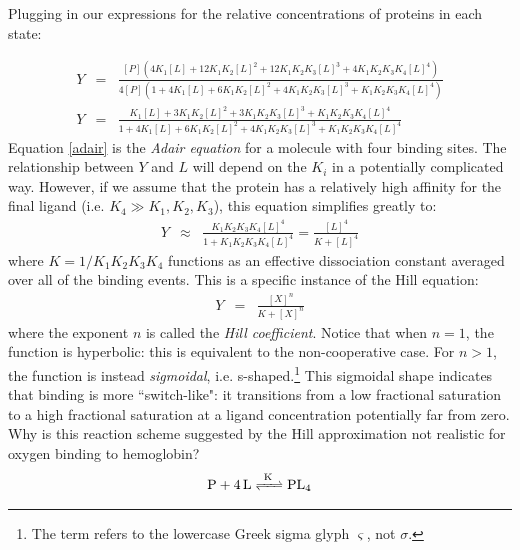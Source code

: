 \documentclass{article}
\begin{document}
Plugging in our expressions for the relative concentrations of proteins in each state:

\begin{eqnarray}
Y & = & \frac{\left[ P \right] \left( 4 K_1 \left[ L \right] + 12K_1K_2 \left[ L \right]^2 + 12K_1K_2K_3 \left[ L \right]^3 + 4K_1K_2K_3K_4 \left[ L \right]^4 \right)}{4\left[ P \right] \left( 1 + 4K_1 \left[ L \right] + 6K_1K_2 \left[ L \right]^2 + 4K_1K_2K_3 \left[ L \right]^3 + K_1K_2K_3K_4 \left[ L \right]^4\right)} \nonumber\\
Y & = & \frac{K_1 \left[ L \right] + 3K_1K_2 \left[ L \right]^2 + 3K_1K_2K_3 \left[ L \right]^3 + K_1K_2K_3K_4 \left[ L \right]^4}{1 + 4K_1 \left[ L \right] + 6K_1K_2 \left[ L \right]^2 + 4K_1K_2K_3 \left[ L \right]^3 + K_1K_2K_3K_4 \left[ L \right]^4 \label{adair}}
\end{eqnarray}
Equation \ref{adair} is the \textit{Adair equation} for a molecule with four binding sites. The relationship between $Y$ and $L$ will depend on the $K_i$ in a potentially complicated way. However, if we assume that the protein has a relatively high affinity for the final ligand (i.e. $K_4 \gg K_1, K_2, K_3$), this equation simplifies greatly to:
\begin{eqnarray*}
Y & \approx & \frac{K_1K_2K_3K_4 \left[ L \right]^4}{1 + K_1K_2K_3K_4 \left[ L \right]^4} = \frac{\left[ L \right]^4}{K + \left[ L \right]^4}
\end{eqnarray*}
where $K = 1/K_1K_2K_3K_4$ functions as an effective dissociation constant averaged over all of the binding events. This is a specific instance of the Hill equation:
\begin{eqnarray}
Y & = & \frac{\left[ X \right]^n}{K + \left[ X \right]^n\label{hill}}
\end{eqnarray}
where the exponent $n$ is called the \textit{Hill coefficient}. Notice that when $n=1$, the function is hyperbolic: this is equivalent to the non-cooperative case. For $n > 1$, the function is instead \textit{sigmoidal}, i.e. s-shaped.\footnote{The term refers to the lowercase Greek sigma glyph $\varsigma$, not $\sigma$.} This sigmoidal shape indicates that binding is more ``switch-like": it transitions from a low fractional saturation to a high fractional saturation at a ligand concentration potentially far from zero.\\

Why is this reaction scheme suggested by the Hill approximation not realistic for oxygen binding to hemoglobin?
\begin{eqnarray*}
\ce{P + 4L <=>[K] PL_4}
\end{eqnarray*}
\end{document}
